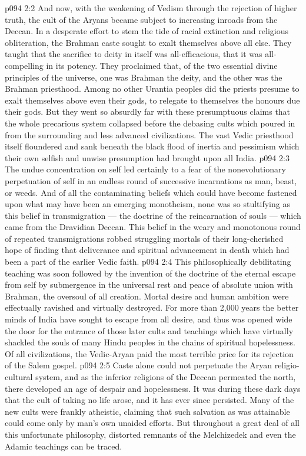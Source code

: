\vs p094 2:2 And now, with the weakening of Vedism through the rejection of higher truth, the cult of the Aryans became subject to increasing inroads from the Deccan. In a desperate effort to stem the tide of racial extinction and religious obliteration, the Brahman caste sought to exalt themselves above all else. They taught that the sacrifice to deity in itself was all\hyp{}efficacious, that it was all\hyp{}compelling in its potency. They proclaimed that, of the two essential divine principles of the universe, one was Brahman the deity, and the other was the Brahman priesthood. Among no other Urantia peoples did the priests presume to exalt themselves above even their gods, to relegate to themselves the honours due their gods. But they went so absurdly far with these presumptuous claims that the whole precarious system collapsed before the debasing cults which poured in from the surrounding and less advanced civilizations. The vast Vedic priesthood itself floundered and sank beneath the black flood of inertia and pessimism which their own selfish and unwise presumption had brought upon all India.
\vs p094 2:3 The undue concentration on self led certainly to a fear of the nonevolutionary perpetuation of self in an endless round of successive incarnations as man, beast, or weeds. And of all the contaminating beliefs which could have become fastened upon what may have been an emerging monotheism, none was so stultifying as this belief in transmigration --- the doctrine of the reincarnation of souls --- which came from the Dravidian Deccan. This belief in the weary and monotonous round of repeated transmigrations robbed struggling mortals of their long\hyp{}cherished hope of finding that deliverance and spiritual advancement in death which had been a part of the earlier Vedic faith.
\vs p094 2:4 This philosophically debilitating teaching was soon followed by the invention of the doctrine of the eternal escape from self by submergence in the universal rest and peace of absolute union with Brahman, the oversoul of all creation. Mortal desire and human ambition were effectually ravished and virtually destroyed. For more than 2,000 years the better minds of India have sought to escape from all desire, and thus was opened wide the door for the entrance of those later cults and teachings which have virtually shackled the souls of many Hindu peoples in the chains of spiritual hopelessness. Of all civilizations, the Vedic\hyp{}Aryan paid the most terrible price for its rejection of the Salem gospel.
\vs p094 2:5 \pc Caste alone could not perpetuate the Aryan religio\hyp{}cultural system, and as the inferior religions of the Deccan permeated the north, there developed an age of despair and hopelessness. It was during these dark days that the cult of taking no life arose, and it has ever since persisted. Many of the new cults were frankly atheistic, claiming that such salvation as was attainable could come only by man’s own unaided efforts. But throughout a great deal of all this unfortunate philosophy, distorted remnants of the Melchizedek and even the Adamic teachings can be traced.
